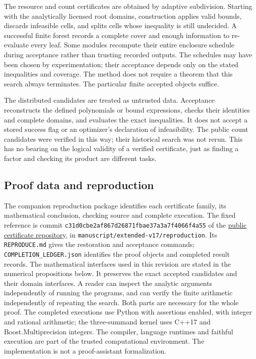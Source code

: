 The resource and count certificates are obtained by adaptive subdivision.
Starting with the analytically licensed root domains, construction
applies valid bounds, discards infeasible cells, and splits cells whose
inequality is still undecided. A successful finite forest records a
complete cover and enough information to re-evaluate every leaf. Some
modules recompute their entire enclosure schedule during acceptance
rather than trusting recorded outputs. The schedules may have been
chosen by experimentation; their acceptance depends only on the stated
inequalities and coverage. The method does not require a theorem that
this search always terminates. The particular finite accepted objects
suffice.

The distributed candidates are treated as untrusted data. Acceptance
reconstructs the defined polynomials or bound expressions, checks their
identities and complete domains, and evaluates the exact inequalities.
It does not accept a stored success flag or an optimizer's declaration
of infeasibility. The public count candidates were verified in this
way; their historical search was not rerun. This has no bearing on the
logical validity of a verified certificate, just as finding a factor
and checking its product are different tasks.

\subsection{Proof data and reproduction}
\label{j:cert:reproduction}
The companion reproduction package identifies each certificate family,
its mathematical conclusion, checking source and complete execution.
The fixed reference is commit
\texttt{c31d0cbe2af867d26871fbae37a3a7f4066f4a55} of the
\href{https://github.com/kolodziejek/berry-esseen-certificates/tree/c31d0cbe2af867d26871fbae37a3a7f4066f4a55/manuscript/extended-v17/reproduction}
{public certificate repository}, in
\texttt{manuscript/extended-v17/reproduction}.
Its \texttt{REPRODUCE.md} gives the restoration and acceptance commands;
\texttt{COMPLETION\_LEDGER.json} identifies the proof objects and
completed result records. The mathematical interfaces used in this
revision are stated in the numerical propositions below.
It preserves the exact accepted candidates and their domain interfaces.
A reader can inspect the analytic arguments independently of running
the programs, and can verify the finite arithmetic independently of
repeating the search. Both parts are necessary for the whole proof.
The completed executions use Python with assertions enabled, with integer and rational
arithmetic; the three-summand kernel uses C++17 and
Boost.Multiprecision integers. The compiler, language runtimes and
faithful execution are part of the trusted computational environment.
The implementation is not a proof-assistant formalization.

